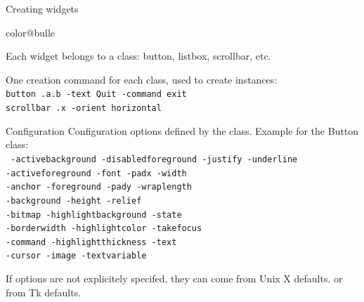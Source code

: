 \documentclass[a4paper,landscape,smooth]{show}
\begin{document}



\begin{tslide}{Creating widgets}
   \vfill
   \begin{bitemize}{color@bulle}
      \item Each widget belongs to a class: button, listbox, scrollbar,
	    etc. 
      \item One creation command for each class, used to create instances:\\
	    {\tt button .a.b -text Quit -command exit}\\
	    {\tt scrollbar .x -orient horizontal}
   \end{bitemize}
   \vfill
\end{tslide}


\begin{tslide}{Configuration}
   \vfill
   Configuration options defined by the class. Example for the Button class:\\
   {\tt
      -activebackground -disabledforeground -justify -underline \\
      -activeforeground -font -padx -width \\
      -anchor -foreground -pady -wraplength \\
      -background -height -relief \\
      -bitmap -highlightbackground -state \\
      -borderwidth -highlightcolor -takefocus \\
      -command -highlightthickness -text \\
      -cursor -image -textvariable \\
}

   \vfill
   If options are not explicitely specifed, they can come from Unix X defaults.
   or from Tk defaults.
   \vfill
\end{tslide}

\end{document}
